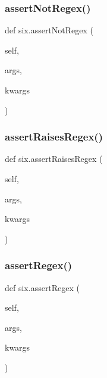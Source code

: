 \mbox{\label{namespacesix_a0f0f9c822f296051be9a059fbc389a50}} 
\subsubsection{\texorpdfstring{assert\+Not\+Regex()}{assertNotRegex()}}
{\footnotesize\ttfamily def six.\+assert\+Not\+Regex (\begin{DoxyParamCaption}\item[{}]{self,  }\item[{}]{args,  }\item[{}]{kwargs }\end{DoxyParamCaption})}

\mbox{\label{namespacesix_a031ebae754b5cae0b4fd56bd2932bd42}} 
\subsubsection{\texorpdfstring{assert\+Raises\+Regex()}{assertRaisesRegex()}}
{\footnotesize\ttfamily def six.\+assert\+Raises\+Regex (\begin{DoxyParamCaption}\item[{}]{self,  }\item[{}]{args,  }\item[{}]{kwargs }\end{DoxyParamCaption})}

\mbox{\label{namespacesix_a772ce739f442ee3640abf1c0bf091749}} 
\subsubsection{\texorpdfstring{assert\+Regex()}{assertRegex()}}
{\footnotesize\ttfamily def six.\+assert\+Regex (\begin{DoxyParamCaption}\item[{}]{self,  }\item[{}]{args,  }\item[{}]{kwargs }\end{DoxyParamCaption})}

\mbox{\label{namespacesix_a6ba531a5f85f3825f47bbaaf01aa331e}} 
